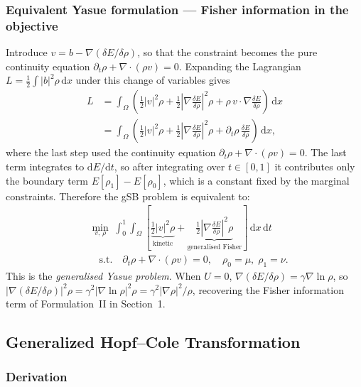 \documentclass[11pt,a4paper]{article}
\newcommand{\ud}{\,\mathrm{d}}    %
\begin{document}
\subsubsection*{Equivalent Yasue formulation — Fisher information in the objective}

Introduce $v = b - \nabla(\delta E/\delta\rho)$, so that the constraint
becomes the pure continuity equation $\partial_t\rho + \nabla\cdot(\rho v) = 0$.
Expanding the Lagrangian $L = \frac{1}{2}\int|b|^2\rho\ud x$ under this
change of variables gives
\begin{align*}
  L
  &= \int_\Omega\!\left(
       \frac{1}{2}|v|^2\rho
     + \frac{1}{2}\left|\nabla\frac{\delta E}{\delta\rho}\right|^2\!\rho
     + \rho\, v\cdot\nabla\frac{\delta E}{\delta\rho}
     \right)\ud x \\
  &= \int_\Omega\!\left(
       \frac{1}{2}|v|^2\rho
     + \frac{1}{2}\left|\nabla\frac{\delta E}{\delta\rho}\right|^2\!\rho
     + \partial_t\rho\,\frac{\delta E}{\delta\rho}
     \right)\ud x,
\end{align*}
where the last step used the continuity equation
$\partial_t\rho + \nabla\cdot(\rho v)=0$.
The last term integrates to $\mathrm{d}E/\mathrm{d}t$, so after integrating
over $t\in[0,1]$ it contributes only the boundary term
$E[\rho_1] - E[\rho_0]$, which is a constant fixed by the marginal constraints.
Therefore the gSB problem is equivalent to:
\begin{align}\label{eq:Yasue}
  &\min_{v,\,\rho}\;\int_0^1\!\int_\Omega\!
    \left[
      \underbrace{\frac{1}{2}|v|^2\rho}_{\text{kinetic}}
    + \underbrace{\frac{1}{2}\left|\nabla\frac{\delta E}{\delta\rho}\right|^2\!\rho}_{\text{generalised Fisher}}
    \right]\ud x\ud t \\
  &\quad\text{s.t.}\quad
   \partial_t\rho + \nabla\cdot(\rho v) = 0,
   \quad \rho_0=\mu,\;\rho_1=\nu.\nonumber
\end{align}
This is the \emph{generalised Yasue problem}.
When $U=0$, $\nabla(\delta E/\delta\rho) = \gamma\nabla\ln\rho$, so
$|\nabla(\delta E/\delta\rho)|^2\rho = \gamma^2|\nabla\ln\rho|^2\rho
= \gamma^2|\nabla\rho|^2/\rho$, recovering the Fisher information term
of Formulation~II in Section~1.

\subsection{Generalized Hopf--Cole Transformation}

\subsubsection*{Derivation}
\end{document}
